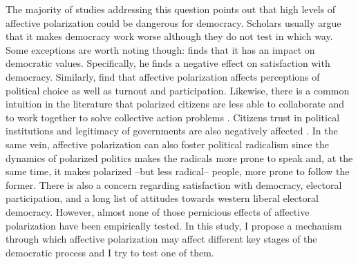 \documentclass[a4paper, svgnames]{article}
\begin{document}
The majority of studies addressing this question points out that high levels of affective polarization could be dangerous for democracy. Scholars usually argue that it makes democracy work worse although they do not test in which way. Some exceptions are worth noting though: \cite{Wagner2021} finds that it has an impact on democratic values. Specifically, he finds a negative effect on satisfaction with democracy. Similarly, \cite{Ward2019} find that affective polarization affects perceptions of political choice as well as turnout and participation. Likewise, there is a common intuition in the literature that polarized citizens are less able to collaborate and to work together to solve collective action problems \citep{Garrett2014}. Citizens trust in political institutions and legitimacy of governments are also negatively affected \citep{Orriols2021}. In the same vein, affective polarization can also foster political radicalism \citep{Levendusky2013, Rogowski2016, Webster2017} since the dynamics of polarized politics makes the radicals more prone to speak and, at the same time, it makes polarized --but less radical-- people, more prone to follow the former. There is also a concern regarding satisfaction with democracy, electoral participation, and a long list of attitudes towards western liberal electoral democracy. However, almost none of those pernicious effects of affective polarization have been empirically tested. In this study, I propose a mechanism through which affective polarization may affect different key stages of the democratic process and I try to test one of them.
\end{document}
